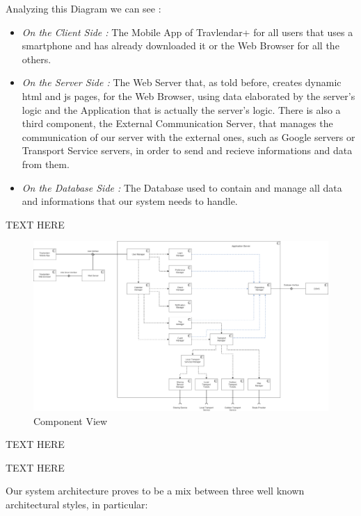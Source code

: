 Analyzing this Diagram we can see :
\begin{itemize}
	\setlength{\leftskip}{0.5cm}
	\item \emph{On the Client Side : }The Mobile App of Travlendar+ for all users that uses a smartphone and has already downloaded it or the Web Browser for all the others.
	\item \emph{On the Server Side : }The Web Server that, as told before, creates dynamic html and js pages, for the Web Browser, using data elaborated by the server's logic and the Application that is actually the server's logic. There is also a third component, the External Communication Server, that manages the communication of our server with the external ones, such as Google servers or Transport Service servers, in order to send and recieve informations and data from them.
	\item \emph{On the Database Side : }The Database used to contain and manage all data and informations that our system needs to handle.
\end{itemize}


TEXT HERE

\begin{figure}[H]
	\centering
	\includegraphics[scale=0.2]{Images/Architecture/Components_View}
	\caption{Component View}
\end{figure}


TEXT HERE


TEXT HERE


Our system architecture proves to be a mix between three well known architectural styles, in particular: 

